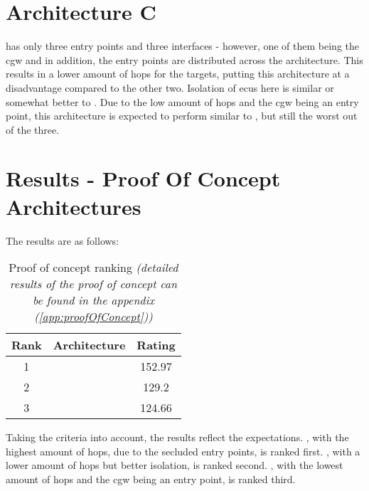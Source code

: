 \section{Architecture C}
\label{sec:archc}

 has only three entry points and three interfaces - however, one of them being the \acrshort{cgw} and 
in addition, the entry points are distributed across the architecture. 
This results in a lower amount of hops for the targets, putting this architecture at a disadvantage compared to the other two.
Isolation of \acrshort{ecu}s here is similar or somewhat better to .
Due to the low amount of hops and the \acrshort{cgw} being an entry point, this architecture is expected to perform 
similar to , but still the worst out of the three.


\section{Results - Proof Of Concept Architectures}
\label{sec:resultsproof}

The results are as follows:\\

\begin{table}[h]
    \label{table:pocranking}
    \centering
    \begin{tabular}{ |c|c|c| } 
    \hline
    Rank & Architecture & Rating\\
    \hline
    1 & \nameref{fig:architectureA} & 152.97\\ 
    2 & \nameref{fig:architectureB} & 129.2\\
    3 & \nameref{fig:architectureC} & 124.66\\
    \hline
    \end{tabular}
    \caption{Proof of concept ranking \textit{(detailed results of the proof of concept can be found in the appendix (\ref{app:proofOfConcept}))}}
\end{table}

\hfill \break

Taking the criteria into account, the results reflect the expectations.
, with the highest amount of hops, due to the secluded entry points, is ranked first.
, with a lower amount of hops but better isolation, is ranked second.
, with the lowest amount of hops and the \acrshort{cgw} being an entry point, is ranked third.\\

